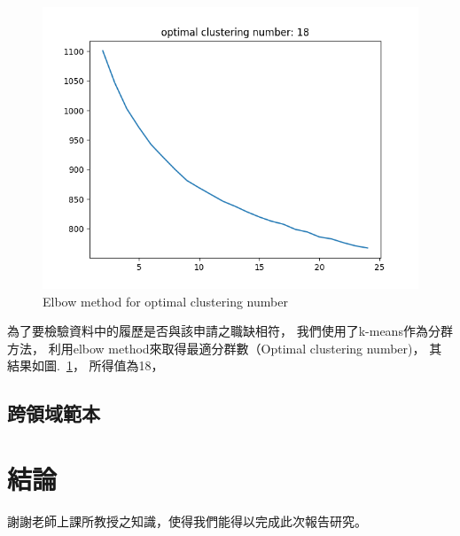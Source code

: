 \documentclass[acmsmall]{acmart}
\begin{document}
\begin{figure}
    \centerline{\includegraphics[width=1.0\textwidth]{elbow_method.png}}
    \caption{Elbow method for optimal clustering number}
    \label{elbow_method}
\end{figure}

為了要檢驗資料中的履歷是否與該申請之職缺相符，
我們使用了k-means\cite{macqueen1967some}作為分群方法，
利用elbow method來取得最適分群數（Optimal clustering number)，
其結果如圖.~\ref{elbow_method}，
所得值為18，


\subsection{跨領域範本}

\section{結論}


\begin{acks}
    謝謝老師上課所教授之知識，使得我們能得以完成此次報告研究。
\end{acks}



\end{document}
